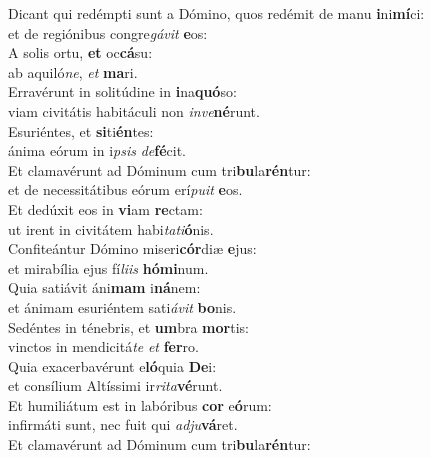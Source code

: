 \evenverse Dicant qui redémpti sunt a Dómino, quos redémit de manu \textbf{i}ni\textbf{mí}ci:~\*\\
\evenverse et de regiónibus congre\textit{gá}\textit{vit} \textbf{e}os:\\
\oddverse A solis ortu, \textbf{et} oc\textbf{cá}su:~\*\\
\oddverse ab aquiló\textit{ne}, \textit{et} \textbf{ma}ri.\\
\evenverse Erravérunt in solitúdine in \textbf{i}na\textbf{quó}so:~\*\\
\evenverse viam civitátis habitáculi non \textit{in}\textit{ve}\textbf{né}runt.\\
\oddverse Esuriéntes, et \textbf{si}ti\textbf{én}tes:~\*\\
\oddverse ánima eórum in i\textit{psis} \textit{de}\textbf{fé}cit.\\
\evenverse Et clamavérunt ad Dóminum cum tri\textbf{bu}la\textbf{rén}tur:~\*\\
\evenverse et de necessitátibus eórum erí\textit{pu}\textit{it} \textbf{e}os.\\
\oddverse Et dedúxit eos in \textbf{vi}am \textbf{re}ctam:~\*\\
\oddverse ut irent in civitátem habi\textit{ta}\textit{ti}\textbf{ó}nis.\\
\evenverse Confiteántur Dómino miseri\textbf{cór}diæ \textbf{e}jus:~\*\\
\evenverse et mirabília ejus fí\textit{li}\textit{is} \textbf{hó}\textbf{mi}num.\\
\oddverse Quia satiávit áni\textbf{mam} i\textbf{ná}nem:~\*\\
\oddverse et ánimam esuriéntem sati\textit{á}\textit{vit} \textbf{bo}nis.\\
\evenverse Sedéntes in ténebris, et \textbf{um}bra \textbf{mor}tis:~\*\\
\evenverse vinctos in mendicitá\textit{te} \textit{et} \textbf{fer}ro.\\
\oddverse Quia exacerbavérunt e\textbf{ló}quia \textbf{De}i:~\*\\
\oddverse et consílium Altíssimi ir\textit{ri}\textit{ta}\textbf{vé}runt.\\
\evenverse Et humiliátum est in labóribus \textbf{cor} e\textbf{ó}rum:~\*\\
\evenverse infirmáti sunt, nec fuit qui \textit{ad}\textit{ju}\textbf{vá}ret.\\
\oddverse Et clamavérunt ad Dóminum cum tri\textbf{bu}la\textbf{rén}tur:~\*\\
